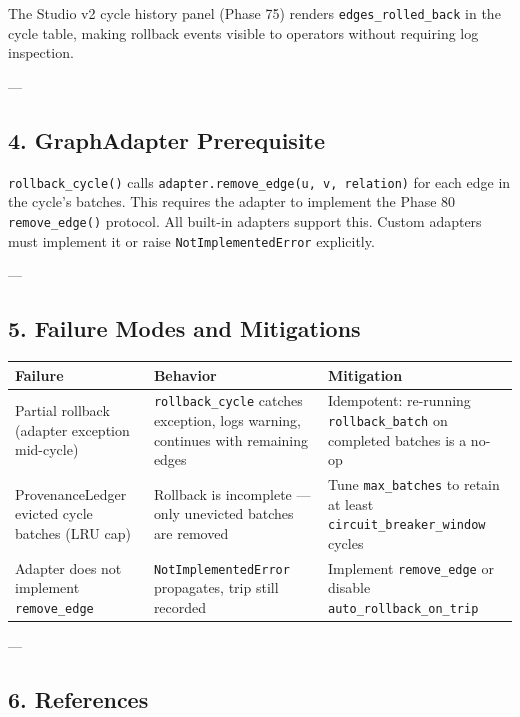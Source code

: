 The Studio v2 cycle history panel (Phase 75) renders \texttt{edges\_rolled\_back} in the cycle table, making rollback events visible to operators without requiring log inspection.

---

\subsection{4. GraphAdapter Prereq\-uisite}

\texttt{rollback\_cycle()} calls \texttt{adapter.remove\_edge(u, v, relation)} for each edge in the cycle's batches. This requires the adapter to implement the Phase 80 \texttt{remove\_edge()} protocol. All built-in adapters support this. Custom adapters must implement it or raise \texttt{NotImplementedError} explicitly.

---

\subsection{5. Failure Modes and Mitigations}

\begin{center}
{\footnotesize
\begin{tabularx}{\columnwidth}{|>{\raggedright\arraybackslash}X|>{\raggedright\arraybackslash}X|>{\raggedright\arraybackslash}X|}
\hline
Failure & Behavior & Mitigation \\ \hline
Partial rollback (adapter exception mid-cycle) & \texttt{rollback\_cycle} catches exception, logs warning, continues with remaining edges & Idempotent: re-running \texttt{rollback\_batch} on completed batches is a no-op \\ \hline
ProvenanceLedger evicted cycle batches (LRU cap) & Rollback is incomplete — only unevicted batches are removed & Tune \texttt{max\_batches} to retain at least \texttt{circuit\_breaker\_window} cycles \\ \hline
Adapter does not implement \texttt{remove\_edge} & \texttt{NotImplementedError} propagates, trip still recorded & Implement \texttt{remove\_edge} or disable \texttt{auto\_rollback\_on\_trip} \\ \hline
\end{tabularx}
}
\end{center}

---

\subsection{6. References}

